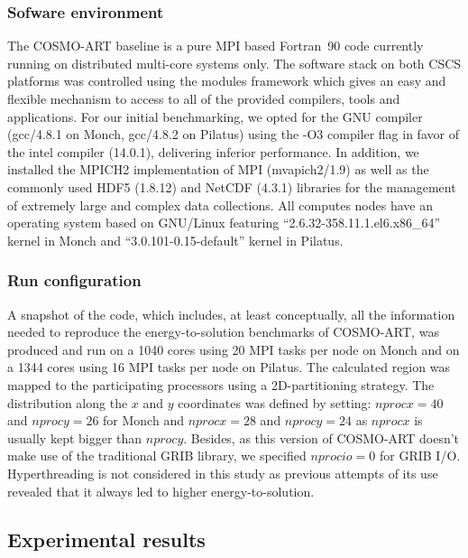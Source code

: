 \subsubsection{Sofware environment}
The COSMO-ART baseline  is a pure MPI based  Fortran~90 code currently
running on distributed multi-core systems only.  The software stack on
both CSCS  platforms was controlled using the  modules framework which
gives an easy and flexible mechanism  to access to all of the provided
compilers, tools  and applications.  For our  initial benchmarking, we
opted for the GNU compiler  (gcc/4.8.1 on Monch, gcc/4.8.2 on Pilatus)
using the -O3  compiler flag in favor of  the intel compiler (14.0.1),
delivering inferior performance.  In addition, we installed the MPICH2
implementation of MPI (mvapich2/1.9) as well as the commonly used HDF5
(1.8.12) and NetCDF (4.3.1)  libraries for the management of extremely
large  and  complex data  collections.   All  computes  nodes have  an
operating      system      based      on      GNU/Linux      featuring
``2.6.32-358.11.1.el6.x86\_64''      kernel      in     Monch      and
``3.0.101-0.15-default'' kernel in Pilatus.

\subsubsection{Run configuration}
A snapshot of the code, which includes, at least conceptually, all the
information needed  to reproduce the  energy-to-solution benchmarks of
COSMO-ART, was produced and run on a 1040 cores using 20 MPI tasks per
node on  Monch and  on a  1344 cores using  16 MPI  tasks per  node on
Pilatus.   The  calculated  region  was mapped  to  the  participating
processors using  a 2D-partitioning strategy.   The distribution along
the $x$  and $y$ coordinates  was defined by setting:  $nprocx=40$ and
$nprocy=26$ for  Monch and $nprocx=28$ and $nprocy=24$  as $nprocx$ is
usually  kept  bigger than  $nprocy$.   Besides,  as  this version  of
COSMO-ART  doesn't  make  use  of  the traditional  GRIB  library,  we
specified $nprocio=0$ for GRIB  I/O.  Hyperthreading is not considered
in this study as previous attempts  of its use revealed that it always
led to higher energy-to-solution.\\

\subsection{Experimental results}
\label{subsec:4.3}

